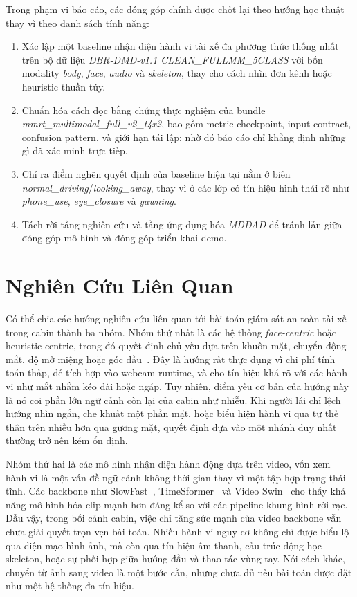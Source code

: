 \documentclass[conference,a4paper]{IEEEtran}
\begin{document}
Trong phạm vi báo cáo, các đóng góp chính được chốt lại theo hướng học thuật thay vì theo danh sách tính năng:
\begin{enumerate}
\item Xác lập một baseline nhận diện hành vi tài xế đa phương thức thống nhất trên bộ dữ liệu \textit{DBR-DMD-v1.1 CLEAN\_FULLMM\_5CLASS} với bốn modality \textit{body}, \textit{face}, \textit{audio} và \textit{skeleton}, thay cho cách nhìn đơn kênh hoặc heuristic thuần túy.
\item Chuẩn hóa cách đọc bằng chứng thực nghiệm của bundle \textit{mmrt\_multimodal\_full\_v2\_t4x2}, bao gồm metric checkpoint, input contract, confusion pattern, và giới hạn tái lập; nhờ đó báo cáo chỉ khẳng định những gì đã xác minh trực tiếp.
\item Chỉ ra điểm nghẽn quyết định của baseline hiện tại nằm ở biên \textit{normal\_driving}/\textit{looking\_away}, thay vì ở các lớp có tín hiệu hình thái rõ như \textit{phone\_use}, \textit{eye\_closure} và \textit{yawning}.
\item Tách rời tầng nghiên cứu và tầng ứng dụng hóa \textit{MDDAD} để tránh lẫn giữa đóng góp mô hình và đóng góp triển khai demo.
\end{enumerate}

\section[Nghien Cuu Lien Quan]{Nghiên Cứu Liên Quan}
Có thể chia các hướng nghiên cứu liên quan tới bài toán giám sát an toàn tài xế trong cabin thành ba nhóm. Nhóm thứ nhất là các hệ thống \textit{face-centric} hoặc heuristic-centric, trong đó quyết định chủ yếu dựa trên khuôn mặt, chuyển động mắt, độ mở miệng hoặc góc đầu~\cite{dms,mediapipe}. Đây là hướng rất thực dụng vì chi phí tính toán thấp, dễ tích hợp vào webcam runtime, và cho tín hiệu khá rõ với các hành vi như mắt nhắm kéo dài hoặc ngáp. Tuy nhiên, điểm yếu cơ bản của hướng này là nó coi phần lớn ngữ cảnh còn lại của cabin như nhiễu. Khi người lái chỉ lệch hướng nhìn ngắn, che khuất một phần mặt, hoặc biểu hiện hành vi qua tư thế thân trên nhiều hơn qua gương mặt, quyết định dựa vào một nhánh duy nhất thường trở nên kém ổn định.

Nhóm thứ hai là các mô hình nhận diện hành động dựa trên video, vốn xem hành vi là một vấn đề ngữ cảnh không-thời gian thay vì một tập hợp trạng thái tĩnh. Các backbone như SlowFast~\cite{slowfast}, TimeSformer~\cite{timesformer} và Video Swin~\cite{videoswin} cho thấy khả năng mô hình hóa clip mạnh hơn đáng kể so với các pipeline khung-hình rời rạc. Dẫu vậy, trong bối cảnh cabin, việc chỉ tăng sức mạnh của video backbone vẫn chưa giải quyết trọn vẹn bài toán. Nhiều hành vi nguy cơ không chỉ được biểu lộ qua diện mạo hình ảnh, mà còn qua tín hiệu âm thanh, cấu trúc động học skeleton, hoặc sự phối hợp giữa hướng đầu và thao tác vùng tay. Nói cách khác, chuyển từ ảnh sang video là một bước cần, nhưng chưa đủ nếu bài toán được đặt như một hệ thống đa tín hiệu.
\end{document}
